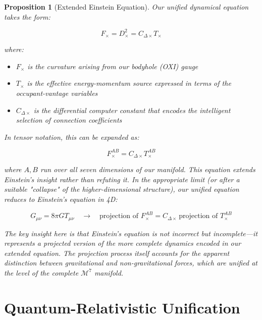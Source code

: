\documentclass{article}
\newtheorem{proposition}{Proposition}
\begin{document}
\begin{proposition}[Extended Einstein Equation]
Our unified dynamical equation takes the form:

\begin{equation}
F_\times = D_\times^2 = C_{\Delta\times} T_\times
\end{equation}

where:

\begin{itemize}
\item $F_\times$ is the curvature arising from our bodyhole (OXI) gauge
\item $T_\times$ is the effective energy-momentum source expressed in terms of the occupant-vantage variables
\item $C_{\Delta\times}$ is the differential computer constant that encodes the intelligent selection of connection coefficients
\end{itemize}

In tensor notation, this can be expanded as:

\begin{equation}
F_{\times}^{AB} = C_{\Delta\times} T_{\times}^{AB}
\end{equation}

where $A, B$ run over all seven dimensions of our manifold. This equation extends Einstein's insight rather than refuting it. In the appropriate limit (or after a suitable "collapse" of the higher-dimensional structure), our unified equation reduces to Einstein's equation in 4D:

\begin{equation}
G_{\mu\nu} = 8\pi G T_{\mu\nu} \quad \rightarrow \quad \text{projection of } F_{\times}^{AB} = C_{\Delta\times}\, \text{projection of } T_{\times}^{AB}
\end{equation}

The key insight here is that Einstein's equation is not incorrect but incomplete—it represents a projected version of the more complete dynamics encoded in our extended equation. The projection process itself accounts for the apparent distinction between gravitational and non-gravitational forces, which are unified at the level of the complete $\mathcal{M}^7$ manifold.
\end{proposition}

\section{Quantum-Relativistic Unification}
\end{document}
